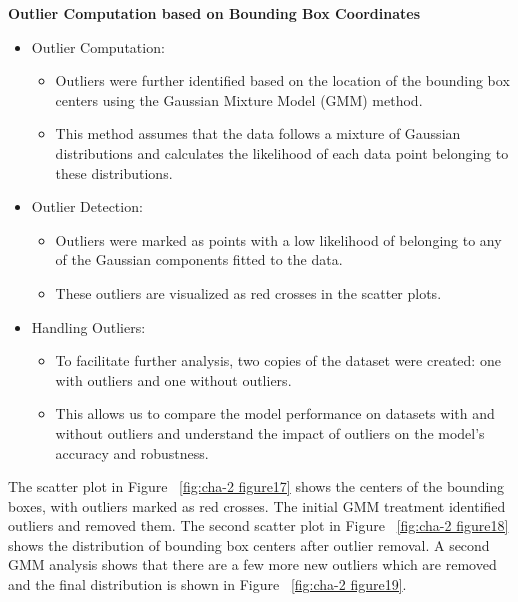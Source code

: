\textbf{Outlier Computation based on Bounding Box Coordinates}
\begin{itemize}
    \item Outlier Computation:
          \begin{itemize}
              \item Outliers were further identified based on the location of the bounding box centers using the Gaussian Mixture Model (GMM) method.
              \item This method assumes that the data follows a mixture of Gaussian distributions and calculates the likelihood of each data point belonging to these distributions.
          \end{itemize}
    \item Outlier Detection:
          \begin{itemize}
              \item Outliers were marked as points with a low likelihood of belonging to any of the Gaussian components fitted to the data.
              \item These outliers are visualized as red crosses in the scatter plots.
          \end{itemize}
    \item Handling Outliers:
          \begin{itemize}
              \item To facilitate further analysis, two copies of the dataset were created: one with outliers and one without outliers.
              \item This allows us to compare the model performance on datasets with and without outliers and understand the impact of outliers on the model's accuracy and robustness.
          \end{itemize}
\end{itemize}

The scatter plot in Figure ~\ref{fig:cha-2 figure17} shows the centers of the bounding boxes, with outliers marked as red crosses. The initial GMM treatment identified outliers and removed them. The second scatter plot in Figure ~\ref{fig:cha-2 figure18} shows the distribution of bounding box centers after outlier removal. A second GMM analysis shows that there are a few more new outliers which are removed and the final distribution is shown in Figure ~\ref{fig:cha-2 figure19}.

